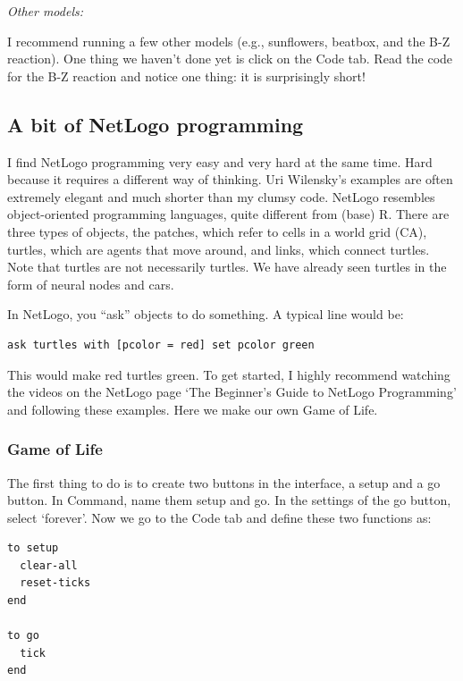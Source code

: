 \documentclass[
  letterpaper,
]{scrbook}
\begin{document}
\emph{Other models:}

I recommend running a few other models (e.g., sunflowers, beatbox, and
the B-Z reaction). One thing we haven't done yet is click on the Code
tab. Read the code for the B-Z reaction and notice one thing: it is
surprisingly short!

\hypertarget{a-bit-of-netlogo-programming}{%
\subsection{A bit of NetLogo
programming}\label{a-bit-of-netlogo-programming}}

I find NetLogo programming very easy and very hard at the same time.
Hard because it requires a different way of thinking. Uri Wilensky's
examples are often extremely elegant and much shorter than my clumsy
code. NetLogo resembles object-oriented programming languages, quite
different from (base) R. There are three types of objects, the patches,
which refer to cells in a world grid (CA), turtles, which are agents
that move around, and links, which connect turtles. Note that turtles
are not necessarily turtles. We have already seen turtles in the form of
neural nodes and cars.

In NetLogo, you ``ask'' objects to do something. A typical line would
be:

\begin{verbatim}
ask turtles with [pcolor = red] set pcolor green
\end{verbatim}

This would make red turtles green. To get started, I highly recommend
watching the videos on the NetLogo page `The Beginner's Guide to NetLogo
Programming' and following these examples. Here we make our own Game of
Life.

\hypertarget{game-of-life}{%
\subsubsection{Game of Life}\label{game-of-life}}

The first thing to do is to create two buttons in the interface, a setup
and a go button. In Command, name them setup and go. In the settings of
the go button, select `forever'. Now we go to the Code tab and define
these two functions as:

\begin{verbatim}
to setup
  clear-all
  reset-ticks
end

to go
  tick
end
\end{verbatim}
\end{document}
